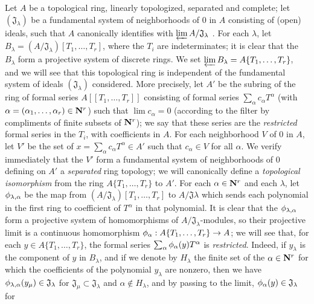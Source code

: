 \begin{env}[7.5.1]
\label{0.7.5.1}
Let $A$ be a topological ring, linearly topologized, separated and complete; let
$(\mathfrak{J}_\lambda)$ be a fundamental system of neighborhoods of $0$ in $A$
consisting of (open) ideals, such that $A$ canonically identifies with
$\varprojlim A/\mathfrak{J}_\lambda$ . For each
$\lambda$, let $B_\lambda=(A/\mathfrak{J}_\lambda)[T_1,\dots,T_r]$, where the
$T_i$ are indeterminates; it is clear that the $B_\lambda$ form a projective system
of discrete rings. We set $\varprojlim B_\lambda=A\{T_1,\dots,T_r\}$, and we will
see that this topological ring is independent of the fundamental system of ideals
$(\mathfrak{J}_\lambda)$ considered. More precisely, let $A'$ be the subring of the
ring of formal series $A[\![T_1,\dots,T_r]\!]$ consisting of formal series
$\sum_\alpha c_\alpha T^\alpha$ (with $\alpha=(\alpha_1,\dots,\alpha_r)\in\mathbf{N}^r$)
such that $\lim c_\alpha=0$ (according to the filter by compliments of finite subsets
of $\mathbf{N}^r$); we say that these series are the \emph{restricted} formal series in the
$T_i$, with coefficients in $A$.
For each neighborhood $V$ of $0$ in $A$, let $V'$ be the set of
$x=\sum_\alpha c_\alpha T^\alpha\in A'$ such that $c_\alpha\in V$ for all $\alpha$.
We verify immediately that the $V'$ form a fundamental system of neighborhoods of $0$
defining on $A'$ a \emph{separated} ring topology; we will canonically define a
\emph{topological isomorphism} from the ring $A\{T_1,\dots,T_r\}$ to $A'$. For each
$\alpha\in\mathbf{N}^r$ and each $\lambda$, let $\phi_{\lambda,\alpha}$ be the map from
$(A/\mathfrak{J}_\lambda)[T_1,\dots,T_r]$ to $A/\mathfrak{J}\lambda$ which sends each
polynomial in the first ring to coefficient of $T^\alpha$ in that polynomial. It is
clear that the $\phi_{\lambda,\alpha}$ form a projective system of homomorphisms of
$A/\mathfrak{J}_\lambda$-modules, so their projective limit is a continuous
homomorphism $\vphi_\alpha:A\{T_1,\dots,T_r\}\to A$; we will see that, for each
$y\in A\{T_1,\dots,T_r\}$, the formal series $\sum_\alpha\phi_\alpha(y)T^\alpha$ is
\emph{restricted}. Indeed, if $y_\lambda$ is the component of $y$ in $B_\lambda$, and
if we denote by $H_\lambda$ the finite set of the $\alpha\in\mathbf{N}^r$ for which the
coefficients of the polynomial $y_\lambda$ are nonzero, then we have
$\phi_{\lambda,\alpha}(y_\mu)\in\mathfrak{J}_\lambda$ for
$\mathfrak{J}_\mu\subset\mathfrak{J}_\lambda$ and $\alpha\not\in H_\lambda$, and by
passing to the limit, $\phi_\alpha(y)\in\mathfrak{J}_\lambda$ for

\end{env}
